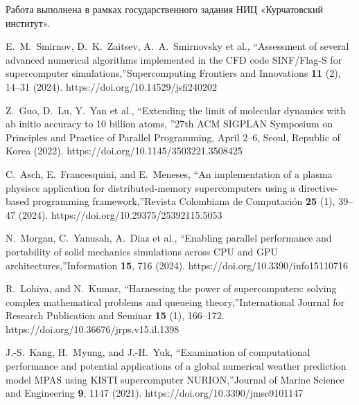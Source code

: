 \documentclass[
11pt,%
tightenlines,%
twoside,%
onecolumn,%
nofloats,%
nobibnotes,%
nofootinbib,%
superscriptaddress,%
noshowpacs,%
centertags]%
{revtex4}
\begin{document}
\begin{acknowledgments}
Работа выполнена в рамках государственного задания НИЦ «Курчатовский институт».
\end{acknowledgments}

%
%

\begin{thebibliography}{99}

E.~M.~Smirnov, D.~K.~Zaitsev, A.~A.~Smirnovsky et al., \textquotedblleft Assessment of several advanced numerical algorithms implemented in the CFD code SINF/Flag-S for supercomputer simulations,\textquotedblright Supercomputing Frontiers and Innovations \textbf{11} (2), 14--31 (2024). https://doi.org/10.14529/jsfi240202

Z.~Guo, D.~Lu, Y.~Yan et al., \textquotedblleft Extending the limit of molecular dynamics with ab initio accuracy to 10 billion atoms, \textquotedblright 27th ACM SIGPLAN Symposium on Principles and Practice of Parallel Programming, April 2--6, Seoul, Republic of Korea (2022). https://doi.org/10.1145/3503221.3508425

C.~Asch, E.~Francesquini, and E.~Meneses, \textquotedblleft An implementation of a plasma physiscs application for distributed-memory supercomputers using a directive-based programming framework,\textquotedblright Revista Colombiana de Computaci\'on \textbf{25} (1), 39--47 (2024). https://doi.org/10.29375/25392115.5053

N.~Morgan, C.~Yanusah, A.~Diaz et al., \textquotedblleft Enabling parallel performance and portability of solid mechanics simulations across CPU and GPU architectures,\textquotedblright Information \textbf{15}, 716 (2024). https://doi.org/10.3390/info15110716

R.~Lohiya, and N.~Kumar, \textquotedblleft Harnessing the power of supercomputers: solving complex mathematical problems and queueing theory,\textquotedblright International Journal for Research Publication and Seminar \textbf{15} (1), 166--172. https://doi.org/10.36676/jrps.v15.il.1398

J.-S.~Kang, H.~Myung, and J.-H.~Yuk, \textquotedblleft Examination of computational performance and potential applications of a global numerical weather prediction model MPAS using KISTI supercomputer NURION,\textquotedblright Journal of Marine Science and Engineering \textbf{9}, 1147 (2021). https://doi.org/10.3390/jmse9101147


\end{thebibliography}
\end{document}
